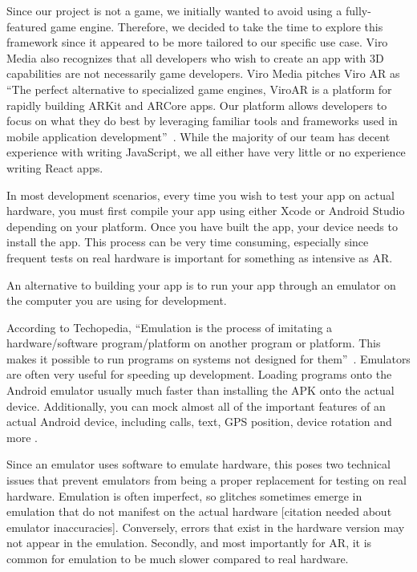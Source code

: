 \documentclass[a4paper, 10pt, american, titlepage]{article}
\begin{document}
Since our project is not a game, we initially wanted to avoid using a
fully-featured game engine. Therefore, we decided to take the time to explore
this framework since it appeared to be more tailored to our specific use case.
Viro Media also recognizes that all developers who wish to create an app with
3D capabilities are not necessarily game developers. Viro Media pitches Viro
AR as ``The perfect alternative to specialized game engines, ViroAR is a
platform for rapidly building ARKit and ARCore apps. Our platform allows
developers to focus on what they do best by leveraging familiar tools and
frameworks used in mobile application development''~\autocite{viro2019}.
While the majority of our team has decent experience with writing JavaScript,
we all either have very little or no experience writing React apps.

In most development scenarios, every time you wish to test your app on actual
hardware, you must first compile your app using either Xcode or Android Studio
depending on your platform. Once you have built the app, your device needs to
install the app. This process can be very time consuming, especially since
frequent tests on real hardware is important for something as intensive as
AR.

An alternative to building your app is to run your app through an emulator on
the computer you are using for development.

According to Techopedia, ``Emulation is the process of imitating a
hardware/software program/platform on another program or platform. This makes
it possible to run programs on systems not designed for
them''~\autocite{techopedia2019}. Emulators are often very useful for speeding
up development. Loading programs onto the Android emulator usually much faster
than installing the APK onto the actual device. Additionally, you can mock
almost all of the important features of an actual Android device, including
calls, text, GPS position, device rotation and more \autocite{androidemulator}.

Since an emulator uses software to emulate hardware, this poses two technical
issues that prevent emulators from being a proper replacement for testing on
real hardware.  Emulation is often imperfect, so glitches sometimes emerge in
emulation that do not manifest on the actual hardware [citation needed about
emulator inaccuracies]. Conversely, errors that exist in the hardware version
may not appear in the emulation. Secondly, and most importantly for AR, it is
common for emulation to be much slower compared to real hardware.
\end{document}
